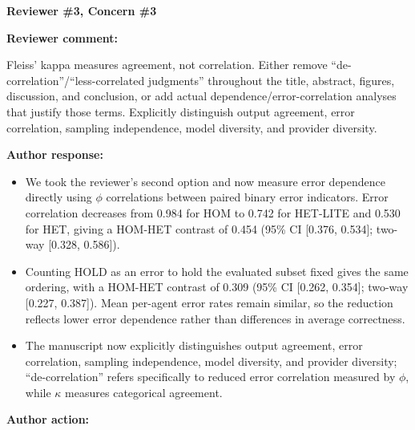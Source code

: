 \documentclass[11pt]{article}
\newcommand{\rvcomment}[1]{{\color{ReviewerGreen}#1}}
\newcommand{\concern}[1]{\textbf{\color{ReviewerGreen}#1}}
\begin{document}
\vspace{12pt}
\concern{Reviewer \#3, Concern \#3}

\concern{Reviewer comment:}

\rvcomment{Fleiss' kappa measures agreement, not correlation. Either remove ``de-correlation''/``less-correlated judgments'' throughout the title, abstract, figures, discussion, and conclusion, or add actual dependence/error-correlation analyses that justify those terms. Explicitly distinguish output agreement, error correlation, sampling independence, model diversity, and provider diversity.}

\textbf{Author response:}

\begin{itemize}

\item We took the reviewer's second option and now measure error dependence directly using $\phi$ correlations between paired binary error indicators. Error correlation decreases from 0.984 for HOM to 0.742 for HET-LITE and 0.530 for HET, giving a HOM-HET contrast of 0.454 (95\% CI [0.376, 0.534]; two-way [0.328, 0.586]).

\item Counting HOLD as an error to hold the evaluated subset fixed gives the same ordering, with a HOM-HET contrast of 0.309 (95\% CI [0.262, 0.354]; two-way [0.227, 0.387]). Mean per-agent error rates remain similar, so the reduction reflects lower error dependence rather than differences in average correctness.

\item The manuscript now explicitly distinguishes output agreement, error correlation, sampling independence, model diversity, and provider diversity; ``de-correlation'' refers specifically to reduced error correlation measured by $\phi$, while $\kappa$ measures categorical agreement.

\end{itemize}

\textbf{Author action:}
\end{document}
